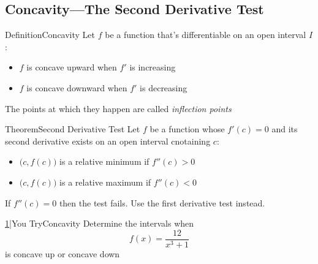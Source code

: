 \documentclass{MathNotes}
\newenvironment{definition}[1]{\begin{RedBox}{Definition}{#1}}{\end{RedBox}}
\newenvironment{theorem}[1]{\begin{GrayBox}{Theorem}{#1}}{\end{GrayBox}}
\newenvironment{practice}[2]{\begin{PurpleBox}{\texorpdfstring{#1}\Big|You Try}{#2}}{\end{PurpleBox}}
\begin{document}
\newpage
\subsection{Concavity---The Second Derivative Test}\label{sec:second-derivative-test}
\begin{multicols}{2}
    \begin{definition}{Concavity}\label{def:concavity}
		Let $f$ be a function that's differentiable on an open interval $I$:
		\begin{itemize}
			\item $f$ is concave upward when $f'$ is increasing
			\item $f$ is concave downward when $f'$ is decreasing
		\end{itemize}
		The points at which they happen are called \textit{inflection points}
	\end{definition}
	\begin{center}
		
	\end{center}
\end{multicols}

\begin{theorem}{Second Derivative Test}\label{th:second-derivative-test}
	Let $f$ be a function whose $f'(c)=0$ and its second derivative exists on an
	open interval cnotaining $c$:
	\begin{itemize}
		\item $\big(c, f(c)\big)$ is a relative minimum if $f''(c)>0$
		\item $\big(c, f(c)\big)$ is a relative maximum if $f''(c)<0$
	\end{itemize}
	If $f''(c)=0$ then the test fails. Use the first derivative test instead.
\end{theorem}

\begin{practice}{\hyperref[ans:concavity]{1}}{Concavity}\label{prac:concavity}
	Determine the intervals when \[f(x)=\frac{12}{x^3+1}\] is concave up
	or concave down
\end{practice}
\end{document}
